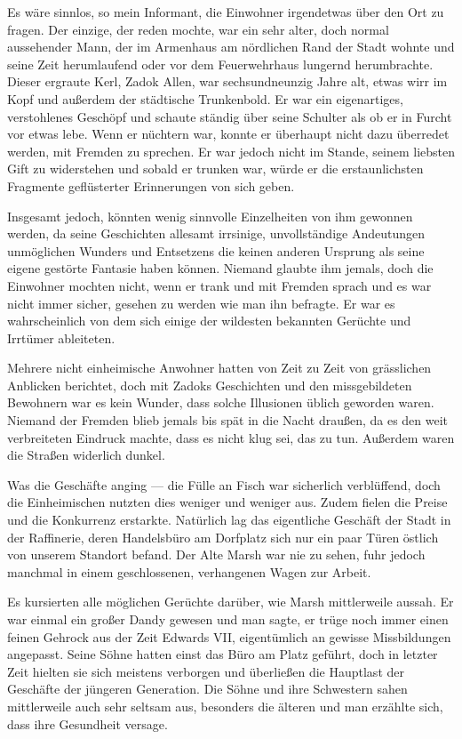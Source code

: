 Es wäre sinnlos, so mein Informant, die Einwohner irgendetwas über den Ort zu fragen. Der einzige, der reden mochte, war ein sehr alter, doch normal aussehender Mann, der im Armenhaus am nördlichen Rand der Stadt wohnte und seine Zeit herumlaufend oder vor dem Feuerwehrhaus lungernd herumbrachte. Dieser ergraute Kerl, Zadok Allen, war sechsundneunzig Jahre alt, etwas wirr im Kopf und außerdem der städtische Trunkenbold. Er war ein eigenartiges, verstohlenes Geschöpf und schaute ständig über seine Schulter als ob er in Furcht vor etwas lebe. Wenn er nüchtern war, konnte er überhaupt nicht dazu überredet werden, mit Fremden zu sprechen. Er war jedoch nicht im Stande, seinem liebsten Gift zu widerstehen und sobald er trunken war, würde er die erstaunlichsten Fragmente geflüsterter Erinnerungen von sich geben.

Insgesamt jedoch, könnten wenig sinnvolle Einzelheiten von ihm gewonnen werden, da seine Geschichten allesamt irrsinige, unvollständige Andeutungen unmöglichen Wunders und Entsetzens die keinen anderen Ursprung als seine eigene gestörte Fantasie haben können. Niemand glaubte ihm jemals, doch die Einwohner mochten nicht, wenn er trank und mit Fremden sprach und es war nicht immer sicher, gesehen zu werden wie man ihn befragte. Er war es wahrscheinlich von dem sich einige der wildesten bekannten Gerüchte und Irrtümer ableiteten.

Mehrere nicht einheimische Anwohner hatten von Zeit zu Zeit von grässlichen Anblicken berichtet, doch mit Zadoks Geschichten und den missgebildeten Bewohnern war es kein Wunder, dass solche Illusionen üblich geworden waren. Niemand der Fremden blieb jemals bis spät in die Nacht draußen, da es den weit verbreiteten Eindruck machte, dass es nicht klug sei, das zu tun. Außerdem waren die Straßen widerlich dunkel.

Was die Geschäfte anging --- die Fülle an Fisch war sicherlich verblüffend, doch die Einheimischen nutzten dies weniger und weniger aus. Zudem fielen die Preise und die Konkurrenz erstarkte. Natürlich lag das eigentliche Geschäft der Stadt in der Raffinerie, deren Handelsbüro am Dorfplatz sich nur ein paar Türen östlich von unserem Standort befand. Der Alte Marsh war nie zu sehen, fuhr jedoch manchmal in einem geschlossenen, verhangenen Wagen zur Arbeit.

Es kursierten alle möglichen Gerüchte darüber, wie Marsh mittlerweile aussah. Er war einmal ein großer Dandy gewesen und man sagte, er trüge noch immer einen feinen Gehrock aus der Zeit Edwards VII, eigentümlich an gewisse Missbildungen angepasst. Seine Söhne hatten einst das Büro am Platz geführt, doch in letzter Zeit hielten sie sich meistens verborgen und überließen die Hauptlast der Geschäfte der jüngeren Generation. Die Söhne und ihre Schwestern sahen mittlerweile auch sehr seltsam aus, besonders die älteren und man erzählte sich, dass ihre Gesundheit versage.

